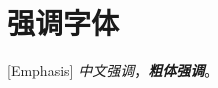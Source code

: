 \documentclass[fontset=fandol]{hithesis}
\begin{document}
\mainmatter
\chapter{强调字体}[Emphasis]
\emph{中文强调}，\textbf{\emph{粗体强调}}。
\begin{algorithm}[htbp]
\caption{字体测试}
\Return{$\alpha$}
\end{algorithm}
\end{document}
